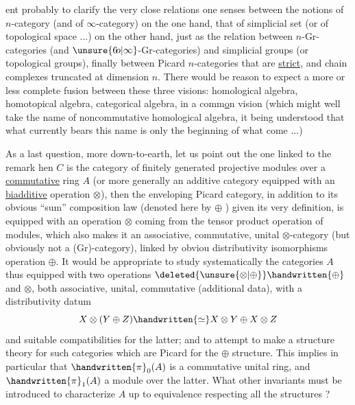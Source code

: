 
ent probably to clarify the very close relations one senses between the notions of $n$-category (and of $\infty$-category) on the one hand, that of simplicial set (or of topological space ...) on the other hand, just as the relation between $n$-Gr-categories (and $\unsure{6\!o|\infty}$-Gr-categories) and simplicial groups (or topological groups), finally between   Picard $n$-categories that are \uline{strict,} and  chain complexes truncated at dimension $n$. There would be reason to expect a more or less complete fusion between these three visions: homological algebra, homotopical algebra, categorical algebra, in a comm\uline{o}n vision (which might well take the name of noncommutative homological algebra, it being understood that what currently bears this name is only the beginning of what   come ...)

As a last question, more down-to-earth, let us point out the one linked to the remark   hen  $C$ is the category of finitely generated projective modules over a \uline{commutative} ring $A$ (or more generally an additive category equipped with an   \uline{biadditive} operation $\otimes$), then the enveloping Picard category, in addition to its obvious ``sum'' composition law (denoted here by $\oplus$ ) given   its very definition, is equipped with an operation $\otimes$ coming from the  tensor product operation of modules, which also makes it an associative, commutative, unital $\otimes$-category (but obviously not a (Gr)-category), linked by obviou distributivity isomorphisms   operation $\oplus$. It would be appropriate to study systematically the categories $A$ thus equipped with two operations $\deleted{\unsure{\otimes|\oplus}}\handwritten{\oplus}$ and $\otimes$, both associative, unital, commutative (additional data), with a distributivity datum
\[
X\otimes(Y\oplus Z)\handwritten{\simeq}X\otimes Y\oplus X\otimes Z
\]
and suitable compatibilities for the latter; and to attempt to make a structure theory for such categories which are  Picard for the $\oplus$ structure. This implies in particular that $\handwritten{\pi}_{0}(A)$ is a commutative unital ring, and $\handwritten{\pi}_{1}(A)$ a module over the latter. What other invariants must be introduced to characterize $A$ up to equivalence respecting all the structures ?

